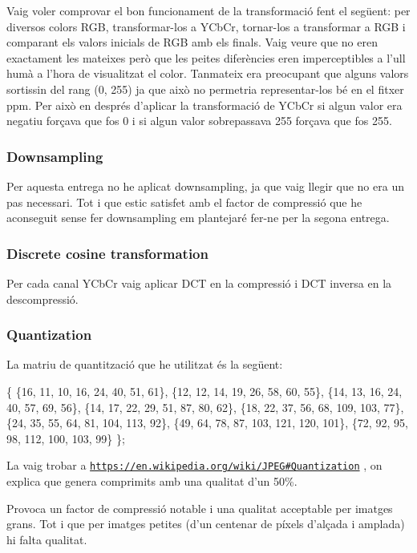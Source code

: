 Vaig voler comprovar el bon funcionament de la transformació fent el següent\+: per diversos colors R\+GB, transformar-\/los a Y\+Cb\+Cr, tornar-\/los a transformar a R\+GB i comparant els valors inicials de R\+GB amb els finals. Vaig veure que no eren exactament les mateixes però que les peites diferències eren imperceptibles a l’ull humà a l’hora de visualitzat el color. Tanmateix era preocupant que alguns valors sortissin del rang (0, 255) ja que això no permetria representar-\/los bé en el fitxer ppm. Per això en després d’aplicar la transformació de Y\+Cb\+Cr si algun valor era negatiu forçava que fos 0 i si algun valor sobrepassava 255 forçava que fos 255.

\subsubsection*{Downsampling}

Per aquesta entrega no he aplicat downsampling, ja que vaig llegir que no era un pas necessari. Tot i que estic satisfet amb el factor de compressió que he aconseguit sense fer downsampling em plantejaré fer-\/ne per la segona entrega.

\subsubsection*{Discrete cosine transformation}

Per cada canal Y\+Cb\+Cr vaig aplicar D\+CT en la compressió i D\+CT inversa en la descompressió.

\subsubsection*{Quantization}

La matriu de quantització que he utilitzat és la següent\+:

\{ \{16, 11, 10, 16, 24, 40, 51, 61\}, \{12, 12, 14, 19, 26, 58, 60, 55\}, \{14, 13, 16, 24, 40, 57, 69, 56\}, \{14, 17, 22, 29, 51, 87, 80, 62\}, \{18, 22, 37, 56, 68, 109, 103, 77\}, \{24, 35, 55, 64, 81, 104, 113, 92\}, \{49, 64, 78, 87, 103, 121, 120, 101\}, \{72, 92, 95, 98, 112, 100, 103, 99\} \};

La vaig trobar a \href{https://en.wikipedia.org/wiki/JPEG#Quantization}{\tt https\+://en.\+wikipedia.\+org/wiki/\+J\+P\+E\+G\#\+Quantization} , on explica que genera comprimits amb una qualitat d’un 50\%.

Provoca un factor de compressió notable i una qualitat acceptable per imatges grans. Tot i que per imatges petites (d’un centenar de píxels d’alçada i amplada) hi falta qualitat.

